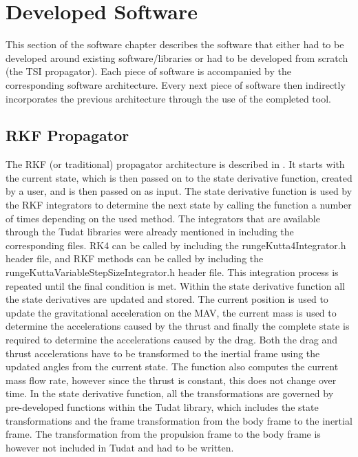 \section{Developed Software}
\label{sec:developedsoftware}
This section of the software chapter describes the software that either had to be developed around existing software/libraries or had to be developed from scratch (the \ac{TSI} propagator). Each piece of software is accompanied by the corresponding software architecture. Every next piece of software then indirectly incorporates the previous architecture through the use of the completed tool.


%




\subsection{\ac{RKF} Propagator}
\label{subsec:rkpropagator}
The \ac{RKF} (or traditional) propagator architecture is described in . It starts with the current state, which is then passed on to the state derivative function, created by a user, and is then passed on as input. The state derivative function is used by the \ac{RKF} integrators to determine the next state by calling the function a number of times depending on the used method. The integrators that are available through the \ac{Tudat} libraries were already mentioned in  including the corresponding files. \ac{RK4} can be called by including the rungeKutta4Integrator.h header file, and \ac{RKF} methods can be called by including the rungeKuttaVariableStepSizeIntegrator.h header file. This integration process is repeated until the final condition is met. Within the state derivative function all the state derivatives are updated and stored. The current position is used to update the gravitational acceleration on the \ac{MAV}, the current mass is used to determine the accelerations caused by the thrust and finally the complete state is required to determine the accelerations caused by the drag. Both the drag and thrust accelerations have to be transformed to the inertial frame using the updated angles from the current state. The function also computes the current mass flow rate, however since the thrust is constant, this does not change over time. In the state derivative function, all the transformations are governed by pre-developed functions within the \ac{Tudat} library, which includes the state transformations and the frame transformation from the body frame to the inertial frame. The transformation from the propulsion frame to the body frame is however not included in \ac{Tudat} and had to be written.


